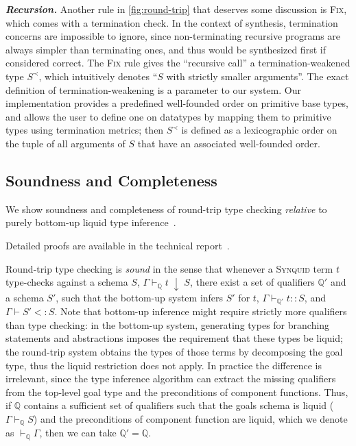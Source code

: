 \documentclass[10pt,preprint]{sigplanconf-pldi16}
\theoremstyle{definition}
\newcommand{\custompar}[1]{\parskip 0pt \textbf{\textit{#1}}}
\newcommand{\Subt}{<:}
\newcommand{\env}{\Gamma}
\newcommand{\consume}{\;\downarrow\;}
\newcommand{\before}{\prec}
\newcommand{\quals}{\mathbb{Q}}
\newcommand{\entailsQ}{\vdash_{\quals}}
\newcommand{\lang}{\textsc{Synquid}\xspace}
\newif\iflong
\begin{document}
\custompar{Recursion.}
Another rule in \autoref{fig:round-trip} that deserves some discussion is \textsc{Fix}, which comes with a termination check.
In the context of synthesis, termination concerns are impossible to ignore,
since non-terminating recursive programs are always simpler than terminating ones, 
and thus would be synthesized first if considered correct.  
The \textsc{Fix} rule gives the ``recursive call'' a termination-weakened type $S^\before$,
which intuitively denotes ``$S$ with strictly smaller arguments''.
The exact definition of termination-weakening is a parameter to our system.
Our implementation provides a predefined well-founded order on primitive base types,
and allows the user to define one on datatypes by mapping them to primitive types using termination metrics;
then $S^\before$ is defined as a lexicographic order on the tuple of all arguments of $S$ that have an associated well-founded order. 


\subsection{Soundness and Completeness}\label{sec:theory:proofs}

We show soundness and completeness of round-trip type checking
\emph{relative} to purely bottom-up liquid type inference~\cite{RondonKaJh08}.
\iflong
For detailed proofs see \autoref{app:proofs}.
\else
Detailed proofs are available in the technical report~\cite{Techreport}.
\fi

Round-trip type checking is \emph{sound} in the sense that 
whenever a \lang term $t$ type-checks against a schema $S$, $\env\entailsQ t\consume S$,
there exist a set of qualifiers $\quals'$ and a schema $S'$,
such that the bottom-up system infers $S'$ for $t$, $\env\vdash_{\quals'} t :: S$,
and $\env\vdash S' \Subt S$.
Note that bottom-up inference might require strictly more qualifiers than type checking: 
in the bottom-up system, generating types for branching statements and abstractions
imposes the requirement that these types be liquid;
the round-trip system obtains the types of those terms by decomposing the goal type,
thus the liquid restriction does not apply.
In practice the difference is irrelevant, 
since the type inference algorithm can extract the missing qualifiers 
from the top-level goal type and the preconditions of component functions.
Thus, if $\quals$ contains a sufficient set of qualifiers
such that the goals schema is liquid ($\env\entailsQ S$) 
and the preconditions of component function are liquid, which we denote as $\entailsQ\env$,
then we can take $\quals' = \quals$.
\end{document}
